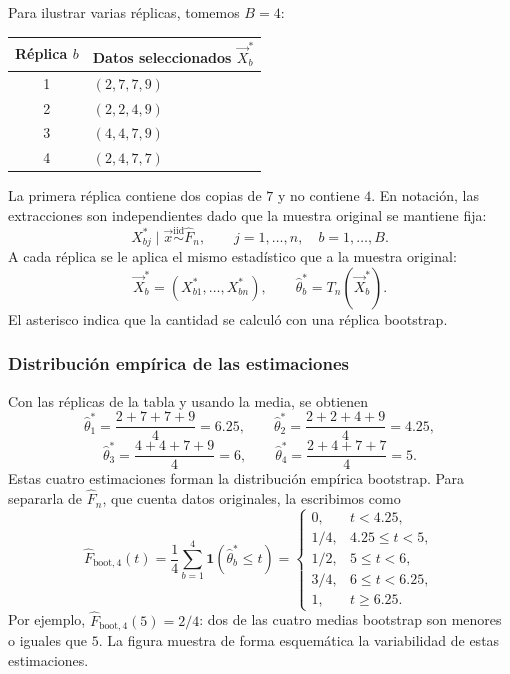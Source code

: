 Para ilustrar varias réplicas, tomemos $B=4$:
\begin{center}
\begin{tabular}{@{}cl@{}}
    \toprule
    Réplica $b$ & Datos seleccionados $\vec{X}_b^*$\\
    \midrule
    1 & $(2,7,7,9)$\\
    2 & $(2,2,4,9)$\\
    3 & $(4,4,7,9)$\\
    4 & $(2,4,7,7)$\\
    \bottomrule
\end{tabular}
\end{center}
La primera réplica contiene dos copias de $7$ y no contiene $4$. En notación,
las extracciones son independientes dado que la muestra original se mantiene
fija:
\[
    X_{bj}^*\mid\vec{x}\overset{\mathrm{iid}}{\sim}\widehat F_n,
    \qquad j=1,\ldots,n,\quad b=1,\ldots,B.
\]
A cada réplica se le aplica el mismo estadístico que a la muestra original:
\[
    \vec{X}_b^*=(X_{b1}^*,\ldots,X_{bn}^*),
    \qquad \widehat\theta_b^*=T_n(\vec{X}_b^*).
\]
El asterisco indica que la cantidad se calculó con una réplica bootstrap.



\subsubsection{Distribución empírica de las estimaciones}

Con las réplicas de la tabla y usando la media, se obtienen
\[
    \widehat\theta_1^*=\frac{2+7+7+9}{4}=6.25,\qquad
    \widehat\theta_2^*=\frac{2+2+4+9}{4}=4.25,
\]
\[
    \widehat\theta_3^*=\frac{4+4+7+9}{4}=6,\qquad
    \widehat\theta_4^*=\frac{2+4+7+7}{4}=5.
\]
Estas cuatro estimaciones forman la distribución empírica bootstrap. Para
separarla de $\widehat F_n$, que cuenta datos originales, la escribimos como
\[
    \widehat F_{\mathrm{boot},4}(t)
    =\frac{1}{4}\sum_{b=1}^{4}\mathbf 1(\widehat\theta_b^*\leq t)
    =
    \begin{cases}
        0, & t<4.25,\\
        1/4, & 4.25\leq t<5,\\
        1/2, & 5\leq t<6,\\
        3/4, & 6\leq t<6.25,\\
        1, & t\geq6.25.
    \end{cases}
\]
Por ejemplo, $\widehat F_{\mathrm{boot},4}(5)=2/4$: dos de las cuatro medias
bootstrap son menores o iguales que $5$. La figura muestra de forma
esquemática la variabilidad de estas estimaciones.

